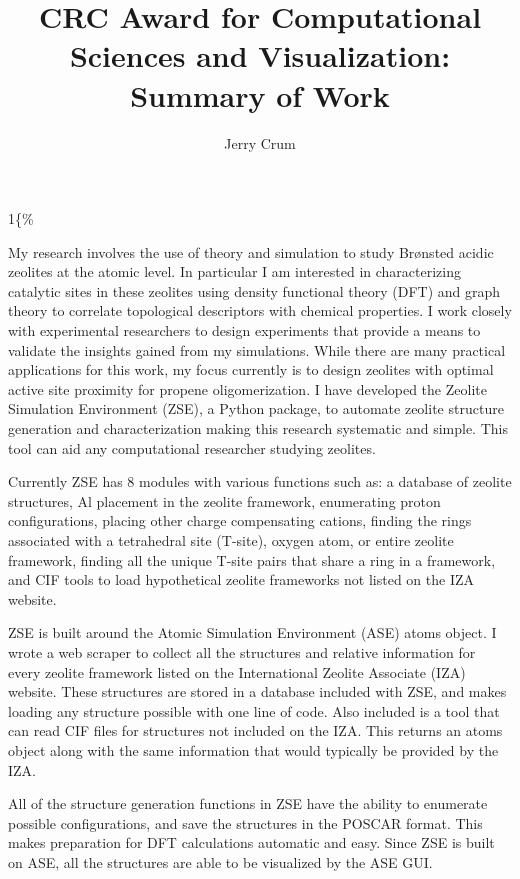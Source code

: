 \documentclass[11pt]{article}
\author{Jerry Crum}
\date{}
\title{CRC Award for Computational Sciences and Visualization: Summary of Work}
\begin{document}
\begin{OPTIONS}
\def\udesoftecoverride\#1\mainmatter\{\%
  \AfterEndPreamble{#1\mainmatter}
\end{OPTIONS}

\maketitle
\Sectionnumbersoff

My research involves the use of theory and simulation to study Br\o nsted acidic zeolites at the atomic level. In particular I am interested in characterizing catalytic sites in these zeolites using density functional theory (DFT) and graph theory to correlate topological descriptors with chemical properties. I work closely with experimental researchers to design experiments that provide a means to validate the insights gained from my simulations. While there are many practical applications for this work, my focus currently is to design zeolites with optimal active site proximity for propene oligomerization. I have developed the Zeolite Simulation Environment (ZSE), a Python package, to automate zeolite structure generation and characterization making this research systematic and simple. This tool can aid any computational researcher studying zeolites. 

Currently ZSE has 8 modules with various functions such as: a database of zeolite structures, Al placement in the zeolite framework, enumerating proton configurations, placing other charge compensating cations, finding the rings associated with a tetrahedral site (T-site), oxygen atom, or entire zeolite framework, finding all the unique T-site pairs that share a ring in a framework, and CIF tools to load hypothetical zeolite frameworks not listed on the IZA website. 

ZSE is built around the Atomic Simulation Environment (ASE) atoms object. \cite{ase-ask} I wrote a web scraper to collect all the structures and relative information for every zeolite framework listed on the International Zeolite Associate (IZA) website. \cite{baerlocher}  These structures are stored in a database included with ZSE, and makes loading any structure possible with one line of code. Also included is a tool that can read CIF files for structures not included on the IZA. This returns an atoms object along with the same information that would typically be provided by the IZA. 

All of the structure generation functions in ZSE have the ability to enumerate possible configurations, and save the structures in the POSCAR format. This makes preparation for DFT calculations automatic and easy. Since ZSE is built on ASE, all the structures are able to be visualized by the ASE GUI. 
\end{document}
